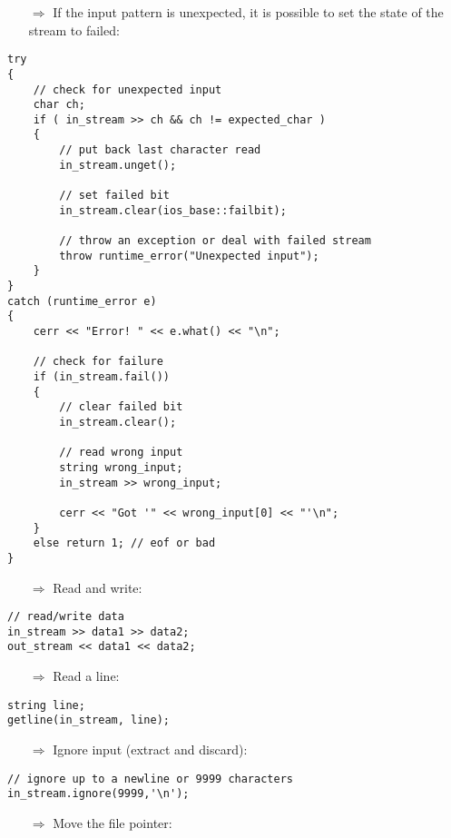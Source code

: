 \documentclass[10pt]{article}
\begin{document}
\begin{enumerate}
\item[$\Rightarrow$] If the input pattern is unexpected, it is possible to set the state of the stream to failed:
\end{enumerate}
\begin{lstlisting}
try
{
    // check for unexpected input
    char ch;
    if ( in_stream >> ch && ch != expected_char )
    {
        // put back last character read
        in_stream.unget();
        
        // set failed bit
        in_stream.clear(ios_base::failbit);
    
        // throw an exception or deal with failed stream
        throw runtime_error("Unexpected input");
    }
}
catch (runtime_error e)
{
    cerr << "Error! " << e.what() << "\n";
            
    // check for failure
    if (in_stream.fail())
    {
        // clear failed bit
        in_stream.clear();
                
        // read wrong input
        string wrong_input;
        in_stream >> wrong_input;
                    
        cerr << "Got '" << wrong_input[0] << "'\n";
    }
    else return 1; // eof or bad
}
\end{lstlisting}
\begin{enumerate}
\item[$\Rightarrow$] Read and write:
\end{enumerate}
\begin{lstlisting}
// read/write data
in_stream >> data1 >> data2;
out_stream << data1 << data2;
\end{lstlisting}
\begin{enumerate}
\item[$\Rightarrow$] Read a line:
\end{enumerate}
\begin{lstlisting}
string line;
getline(in_stream, line);
\end{lstlisting}
\begin{enumerate}
\item[$\Rightarrow$] Ignore input (extract and discard):
\end{enumerate}
\begin{lstlisting}
// ignore up to a newline or 9999 characters
in_stream.ignore(9999,'\n');
\end{lstlisting}
\begin{enumerate}
\item[$\Rightarrow$] Move the file pointer:
\end{enumerate}
\end{document}
